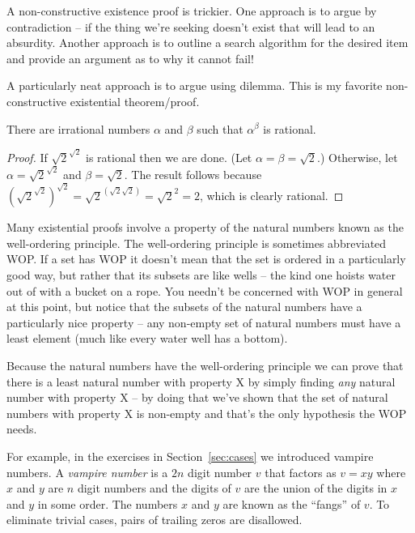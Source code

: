 A non-constructive existence proof is trickier.  One approach is to argue
by contradiction -- if the thing we're seeking doesn't exist that will
lead to an absurdity.  Another approach is to outline a search algorithm
for the desired item and provide an argument as to why it cannot fail!

A particularly neat approach is to argue using dilemma.
This is my favorite non-constructive existential theorem/proof.

\begin{thm}
There are irrational numbers $\alpha$ and $\beta$ such that $\alpha^\beta$
is rational.
\end{thm}

\begin{proof}
If $\sqrt{2}^{\sqrt{2}}$ is rational then we are done.
(Let $ \alpha = \beta = \sqrt{2}$.)  Otherwise, let 
$\alpha = \sqrt{2}^{\sqrt{2}}$ and $\beta = \sqrt{2}$.  The result
follows because $\left(\sqrt{2}^{\sqrt{2}}\right)^{\sqrt{2}} = \sqrt{2}^{(\sqrt{2}\sqrt{2})} 
= \sqrt{2}^2 = 2$, which is clearly rational.

\end{proof} 

Many existential proofs involve a property of the natural numbers
known as the well-ordering principle.  The well-ordering principle is 
sometimes abbreviated WOP.  If a set has WOP it doesn't mean that the 
set is ordered in a particularly good way, but rather that its subsets
are like wells -- the kind one hoists water out of with a bucket on a rope.
You needn't be concerned with WOP in general at this point, but notice
that the subsets of the natural numbers have a particularly nice property
 -- any non-empty set of natural numbers must have a least element (much like
every water well has a bottom).

Because the natural numbers have the well-ordering principle 
we can prove that there is a least 
natural number with property X by simply finding \emph{any} natural
number with property X -- by doing that we've shown that the set of
natural numbers with property X is non-empty and that's the only
hypothesis the WOP needs.  

For example, in the exercises in Section~\ref{sec:cases} we 
introduced vampire numbers. A  \emph{vampire number} 
is a 
$2n$ digit number $v$ that factors as $v=xy$
where $x$ and $y$ are $n$ digit numbers and the digits of $v$ are the 
union of the digits in $x$ and $y$ in some order.  The numbers $x$ and $y$
are known as the ``fangs'' of $v$.  To eliminate trivial
cases, pairs of trailing zeros are disallowed.  


